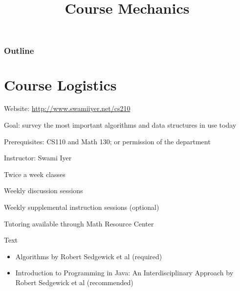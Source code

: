 \documentclass[8pt,a4paper,compress]{beamer}
\title{Course Mechanics}
\date{}
\begin{document}
\begin{frame}
\vfill
\titlepage
\end{frame}

\begin{frame}
\frametitle{Outline}
\tableofcontents
\end{frame}

\section{Course Logistics}
\begin{frame}[fragile]
Website: \href{http://www.swamiiyer.net/cs210}{http://www.swamiiyer.net/cs210}

\bigskip

Goal: survey the most important algorithms and data structures in use today

\bigskip

Prerequisites: CS110 and Math 130; or permission of the department

\bigskip

Instructor: Swami Iyer

\bigskip

Twice a week classes

\bigskip
Weekly discussion sessions

\bigskip

Weekly supplemental instruction sessions (optional)

\bigskip

Tutoring available through Math Resource Center

\bigskip

Text
\begin{itemize}
\item Algorithms by Robert Sedgewick et al (required)
\item Introduction to Programming in Java: An Interdisciplinary Approach  by Robert Sedgewick et al (recommended)
\end{itemize}
\end{frame}
\end{document}
